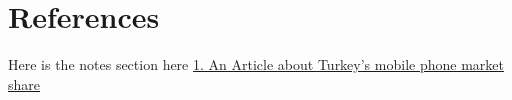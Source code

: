 \documentclass[11pt,a4paper,titlepage]{article}
\begin{document}
\section{References}
Here is the notes section\newline
\hypertarget{market_share}{here}\newline
\href{http://http://sayarbilgi.net/mobil-aygitlar/7-mobil-aygit-haberleri/88-turkiyenin-en-cok-satan-cep-telefonlari.html}{1. An Article about Turkey's mobile phone market share}
\end{document}
